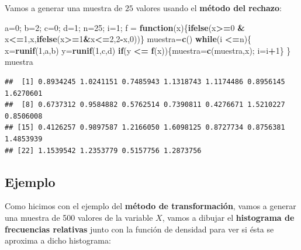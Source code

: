 \documentclass[]{book}
\newenvironment{Shaded}{\begin{snugshade}}{\end{snugshade}}
\newcommand{\ControlFlowTok}[1]{\textcolor[rgb]{0.13,0.29,0.53}{\textbf{#1}}}
\newcommand{\DecValTok}[1]{\textcolor[rgb]{0.00,0.00,0.81}{#1}}
\newcommand{\KeywordTok}[1]{\textcolor[rgb]{0.13,0.29,0.53}{\textbf{#1}}}
\newcommand{\NormalTok}[1]{#1}
\newcommand{\OperatorTok}[1]{\textcolor[rgb]{0.81,0.36,0.00}{\textbf{#1}}}
\newcommand{\StringTok}[1]{\textcolor[rgb]{0.31,0.60,0.02}{#1}}
\begin{document}
Vamos a generar una muestra de \(25\) valores usando el \textbf{método del rechazo}:

\begin{Shaded}
\begin{Highlighting}[]
\NormalTok{a=}\DecValTok{0}\NormalTok{; b=}\DecValTok{2}\NormalTok{; c=}\DecValTok{0}\NormalTok{; d=}\DecValTok{1}\NormalTok{; n=}\DecValTok{25}\NormalTok{; i=}\DecValTok{1}\NormalTok{;}
\NormalTok{f =}\StringTok{ }\ControlFlowTok{function}\NormalTok{(x)\{}\KeywordTok{ifelse}\NormalTok{(x}\OperatorTok{>=}\DecValTok{0} \OperatorTok{&}\StringTok{ }\NormalTok{x}\OperatorTok{<=}\DecValTok{1}\NormalTok{,x,}\KeywordTok{ifelse}\NormalTok{(x}\OperatorTok{>=}\DecValTok{1}\OperatorTok{&}\NormalTok{x}\OperatorTok{<=}\DecValTok{2}\NormalTok{,}\DecValTok{2}\OperatorTok{-}\NormalTok{x,}\DecValTok{0}\NormalTok{))\}}
\NormalTok{muestra=}\KeywordTok{c}\NormalTok{()}
\ControlFlowTok{while}\NormalTok{(i }\OperatorTok{<=}\NormalTok{n)\{}
\NormalTok{  x=}\KeywordTok{runif}\NormalTok{(}\DecValTok{1}\NormalTok{,a,b)}
\NormalTok{  y=}\KeywordTok{runif}\NormalTok{(}\DecValTok{1}\NormalTok{,c,d)}
  \ControlFlowTok{if}\NormalTok{(y }\OperatorTok{<=}\StringTok{ }\KeywordTok{f}\NormalTok{(x))\{muestra=}\KeywordTok{c}\NormalTok{(muestra,x); i=i}\OperatorTok{+}\DecValTok{1}\NormalTok{\}}
\NormalTok{\}}
\NormalTok{muestra}
\end{Highlighting}
\end{Shaded}

\begin{verbatim}
##  [1] 0.8934245 1.0241151 0.7485943 1.1318743 1.1174486 0.8956145 1.6270601
##  [8] 0.6737312 0.9584882 0.5762514 0.7390811 0.4276671 1.5210227 0.8506008
## [15] 0.4126257 0.9897587 1.2166050 1.6098125 0.8727734 0.8756381 1.4853939
## [22] 1.1539542 1.2353779 0.5157756 1.2873756
\end{verbatim}

\hypertarget{ejemplo-34}{%
\subsection{Ejemplo}\label{ejemplo-34}}

Como hicimos con el ejemplo del \textbf{método de transformación}, vamos a generar una muestra de 500 valores de la variable \(X\), vamos a dibujar el \textbf{histograma de frecuencias relativas} junto con la función de densidad para ver si ésta se aproxima a dicho histograma:
\end{document}

